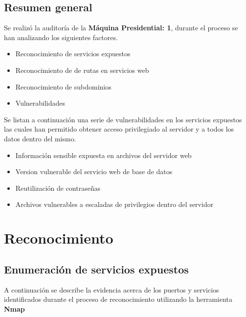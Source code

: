 \documentclass[a4paper]{article}
\newcommand{\machineName}{Máquina Presidential: 1}
\begin{document}

\subsection{Resumen general}
Se realizó la auditoría de la \textbf{\machineName}, durante el proceso se han analizando 
los siguientes factores.
\begin{itemize}
  \item Reconocimiento de servicios expuestos
  \item Reconocimiento de de rutas en servicios web
  \item Reconocimiento de subdominios
  \item Vulnerabilidades
\end{itemize}
\vspace{0.4cm}

Se listan a continuación una serie de vulnerabilidades en los servicios expuestos las
cuales han permitido obtener acceso privilegiado al servidor y a todos los datos dentro
del mismo. 

\vspace{0.4cm}
\begin{itemize}
  \item Información sensible expuesta en archivos del servidor web
  \item Version vulnerable del servicio web de base de datos
  \item Reutilización de contraseñas
  \item Archivos vulnerables a escaladas de privilegios dentro del servidor
\end{itemize}

\clearpage
\section{Reconocimiento}
\subsection{Enumeración de servicios expuestos}

\vspace{0.2cm}

A continuación se describe la evidencia acerca de los puertos y servicios identificados
durante el proceso de reconocimiento utilizando la herramienta \textbf{Nmap} 
\end{document}
